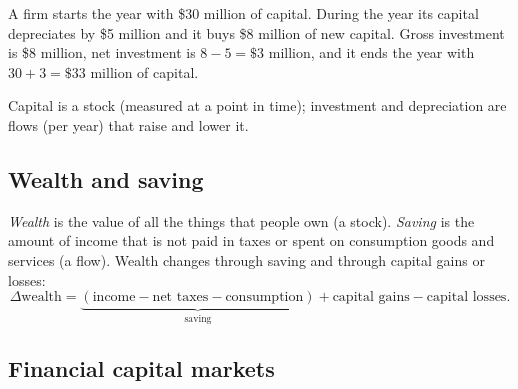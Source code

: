 \begin{example}
A firm starts the year with \$30 million of capital. During the year its capital
depreciates by \$5 million and it buys \$8 million of new capital. Gross investment is
\$8 million, net investment is $8 - 5 = \$3$ million, and it ends the year with
$30 + 3 = \$33$ million of capital.
\end{example}

\begin{center}
\end{center}
Capital is a stock (measured at a point in time); investment and depreciation are flows
(per year) that raise and lower it.

\subsection{Wealth and saving}

\begin{definition}
\emph{Wealth} is the value of all the things that people own (a stock). \emph{Saving} is
the amount of income that is not paid in taxes or spent on consumption goods and
services (a flow). Wealth changes through saving and through capital gains or losses:
\[
  \Delta \text{wealth} = \underbrace{(\text{income} - \text{net taxes} - \text{consumption})}_{\text{saving}}
  + \text{capital gains} - \text{capital losses}.
\]
\end{definition}

\subsection{Financial capital markets}

